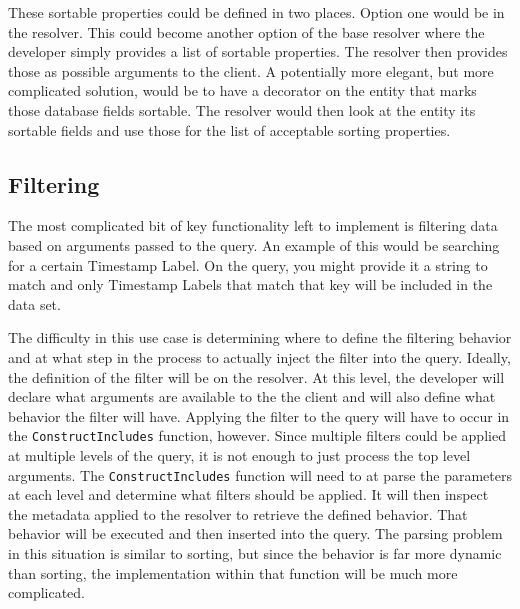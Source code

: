 These sortable properties could be defined in two places.  Option one would be in the resolver.  This could become another option of the base resolver where the developer simply provides a list of sortable properties.  The resolver then provides those as possible arguments to the client.  A potentially more elegant, but more complicated solution, would be to have a decorator on the entity that marks those database fields sortable.  The resolver would then look at the entity its sortable fields and use those for the list of acceptable sorting properties.

\subsection{Filtering}

The most complicated bit of key functionality left to implement is filtering data based on arguments passed to the query.  An example of this would be searching for a certain Timestamp Label.  On the query, you might provide it a string to match and only Timestamp Labels that match that key will be included in the data set.

The difficulty in this use case is determining where to define the filtering behavior and at what step in the process to actually inject the filter into the query.  Ideally, the definition of the filter will be on the resolver. At this level, the developer will declare what arguments are available to the the client and will also define what behavior the filter will have.  Applying the filter to the query will have to occur in the \verb!ConstructIncludes! function, however.  Since multiple filters could be applied at multiple levels of the query, it is not enough to just process the top level arguments.  The \verb!ConstructIncludes! function will need to at parse the parameters at each level and determine what filters should be applied.  It will then inspect the metadata applied to the resolver to retrieve the defined behavior.  That behavior will be executed and then inserted into the query.  The parsing problem in this situation is similar to sorting, but since the behavior is far more dynamic than sorting, the implementation within that function will be much more complicated.